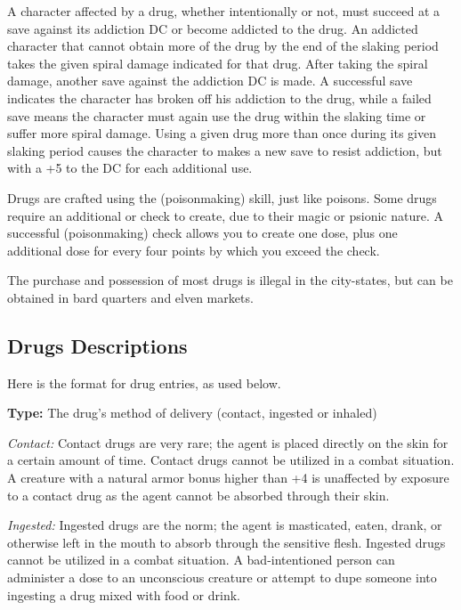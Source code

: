 A character affected by a drug, whether intentionally or not, must succeed at a save against its addiction DC or become addicted to the drug. An addicted character that cannot obtain more of the drug by the end of the slaking period takes the given spiral damage indicated for that drug. After taking the spiral damage, another save against the addiction DC is made. A successful save indicates the character has broken off his addiction to the drug, while a failed save means the character must again use the drug within the slaking time or suffer more spiral damage. Using a given drug more than once during its given slaking period causes the character to makes a new save to resist addiction, but with a +5 to the DC for each additional use.

Drugs are crafted using the  (poisonmaking) skill, just like poisons. Some drugs require an additional  or  check to create, due to their magic or psionic nature. A successful  (poisonmaking) check allows you to create one dose, plus one additional dose for every four points by which you exceed the  check.

The purchase and possession of most drugs is illegal in the city-states, but can be obtained in bard quarters and elven markets.

\subsection{Drugs Descriptions}
Here is the format for drug entries, as used below.

\textbf{Type:} The drug’s method of delivery (contact, ingested or inhaled)

\textit{Contact:} Contact drugs are very rare; the agent is placed directly on the skin for a certain amount of time. Contact drugs cannot be utilized in a combat situation. A creature with a natural armor bonus higher than +4 is unaffected by exposure to a contact drug as the agent cannot be absorbed through their skin.

\textit{Ingested:} Ingested drugs are the norm; the agent is masticated, eaten, drank, or otherwise left in the mouth to absorb through the sensitive flesh. Ingested drugs cannot be utilized in a combat situation. A bad-intentioned person can administer a dose to an unconscious creature or attempt to dupe someone into ingesting a drug mixed with food or drink.

